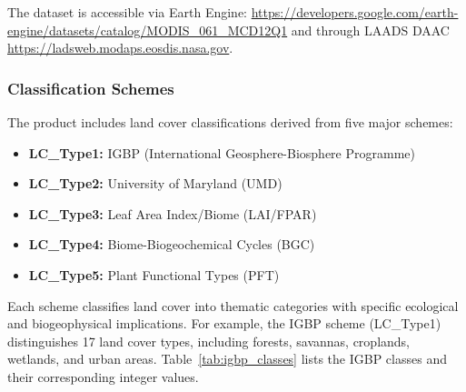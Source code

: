 The dataset is accessible via Earth Engine: \url{https://developers.google.com/earth-engine/datasets/catalog/MODIS_061_MCD12Q1} and through LAADS DAAC \url{https://ladsweb.modaps.eosdis.nasa.gov}.

\subsubsection{Classification Schemes}
The product includes land cover classifications derived from five major schemes:
\begin{itemize}
	\item \textbf{LC\_Type1:} IGBP (International Geosphere-Biosphere Programme)
	\item \textbf{LC\_Type2:} University of Maryland (UMD)
	\item \textbf{LC\_Type3:} Leaf Area Index/Biome (LAI/FPAR)
	\item \textbf{LC\_Type4:} Biome-Biogeochemical Cycles (BGC)
	\item \textbf{LC\_Type5:} Plant Functional Types (PFT)
\end{itemize}

Each scheme classifies land cover into thematic categories with specific ecological and biogeophysical implications. For example, the IGBP scheme (LC\_Type1) distinguishes 17 land cover types, including forests, savannas, croplands, wetlands, and urban areas. Table~\ref{tab:igbp_classes} lists the IGBP classes and their corresponding integer values.

